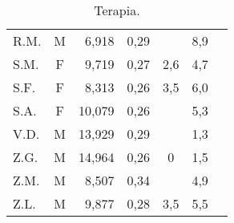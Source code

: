 \begin{table}[!h]
\begin{center}
\begin{tabular}{lcrcccl}
R.M.	& M & 6,918   	      &  0,29     	&                  & 8,9  \\
S.M.	& F & 9,719   	      &  0,27     	& 2,6              & 4,7  \\
S.F.	& F & 8,313   	      &  0,26     	& 3,5              & 6,0  \\
S.A.	& F & 10,079  	      &  0,26     	&                  & 5,3  \\
V.D.	& M & 13,929  	      &  0,29     	&                  & 1,3  \\
Z.G.	& M & 14,964  	      &  0,26     	& 0                & 1,5  \\
Z.M.	& M & 8,507   	      &  0,34     	&                  & 4,9  \\
Z.L.	& M & 9,877   	      &  0,28     	& 3,5              & 5,5  \\
\bottomrule
\end{tabular}
\end{center}
\caption{Terapia.}
\label{tab:Terapia}
\end{table}


